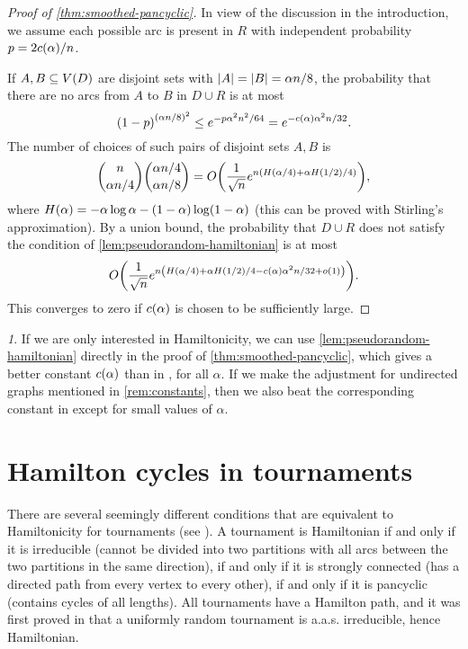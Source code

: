 \documentclass[11pt,english]{article}
\theoremstyle{plain}
\theoremstyle{definition}
\theoremstyle{definition}
\theoremstyle{plain}
\theoremstyle{plain}
\theoremstyle{plain}
\theoremstyle{plain}
\theoremstyle{remark}
\newtheorem{rem}[thm]{\protect\remarkname}
\theoremstyle{remark}
\let\originalleft\left
\let\originalright\right
\renewcommand{\left}{\mathopen{}\mathclose\bgroup\originalleft}
\renewcommand{\right}{\aftergroup\egroup\originalright}
\providecommand{\remarkname}{Remark}
\begin{document}
\begin{proof}
[Proof of \ref{thm:smoothed-pancyclic}]In view of the discussion
in the introduction, we assume each possible arc is present in $R$
with independent probability $p=2\cdi\left(\alpha\right)/n$.

If $A,B\subseteq V\left(D\right)$ are disjoint sets with $\left|A\right|=\left|B\right|=\alpha n/8$,
the probability that there are no arcs from $A$ to $B$ in $D\cup R$
is at most
\[
\left(1-p\right)^{\left(\alpha n/8\right)^{2}}\le e^{-p\alpha^{2}n^{2}/64}=e^{-\cdi\left(\alpha\right)\alpha^{2}n/32}.
\]
The number of choices of such pairs of disjoint sets $A,B$ is 
\[
{n \choose \alpha n/4}{\alpha n/4 \choose \alpha n/8}=O\left(\frac{1}{\sqrt{n}}e^{n\left(H\left(\alpha/4\right)+\alpha H\left(1/2\right)/4\right)}\right),
\]
where $H\left(\alpha\right)=-\alpha\log\alpha-\left(1-\alpha\right)\log\left(1-\alpha\right)$
(this can be proved with Stirling's approximation). By a union bound,
the probability that $D\cup R$ does not satisfy the condition of
\ref{lem:pseudorandom-hamiltonian} is at most
\[
O\left(\frac{1}{\sqrt{n}}e^{n\left(H\left(\alpha/4\right)+\alpha H\left(1/2\right)/4-\cdi\left(\alpha\right)\alpha^{2}n/32+o\left(1\right)\right)}\right).
\]
This converges to zero if $\cdi\left(\alpha\right)$ is chosen to
be sufficiently large.\end{proof}
\begin{rem}
If we are only interested in Hamiltonicity, we can use \ref{lem:pseudorandom-hamiltonian}
directly in the proof of \ref{thm:smoothed-pancyclic}, which gives
a better constant $\cdi\left(\alpha\right)$ than in \cite[Theorem~3]{BFM03},
for all $\alpha$. If we make the adjustment for undirected graphs
mentioned in \ref{rem:constants}, then we also beat the corresponding
constant in \cite[Theorem~1]{BFM03} except for small values of $\alpha$.
\end{rem}

\section{\label{sec:tournaments}Hamilton cycles in tournaments}

There are several seemingly different conditions that are equivalent
to Hamiltonicity for tournaments (see \cite[Chapters~2-3]{Moo68}).
A tournament is Hamiltonian if and only if it is irreducible (cannot
be divided into two partitions with all arcs between the two partitions
in the same direction), if and only if it is strongly connected (has
a directed path from every vertex to every other), if and only if
it is pancyclic (contains cycles of all lengths). All tournaments
have a Hamilton path, and it was first proved in \cite{MM62} that
a uniformly random tournament is a.a.s. irreducible, hence Hamiltonian.
\end{document}
